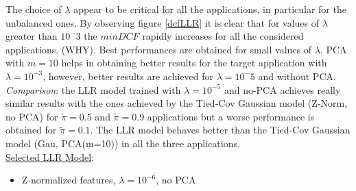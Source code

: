 \documentclass[10pt, a4paper, twocolumn]{article} %
\begin{document}
The choice of $\lambda$ appear to be critical for all the applications, in particular for the 
unbalanced ones. By observing figure \ref{dcfLLR} it is clear that for values of $\lambda$ greater
than $10^-3$ the $minDCF$ rapidly increases for all the considered applications. (WHY). 
Best performances are obtained for small values of $\lambda$. PCA with $m=10$ helps in obtaining better
results for the target application with $\lambda=10^{-3}$, however, better results are achieved for $\lambda=10^-5$
and without PCA.\\
\textit{Comparison}: the LLR model trained with $\lambda=10^{-5}$ and no-PCA achieves really similar results
with the ones achieved by the Tied-Cov Gaussian model (Z-Norm, no PCA) for $\tilde{\pi}=0.5$ and $\tilde{\pi}=0.9$
applications but a worse performance is obtained for $\tilde{\pi}=0.1$. The LLR model behaves better than the
Tied-Cov Gaussian model (Gau, PCA(m=10)) in all the three applications.\\
\underline{Selected LLR Model}: 
\begin{itemize}
	\item Z-normalized features, $\lambda=10^{-6}$, no PCA
\end{itemize}
\end{document}
